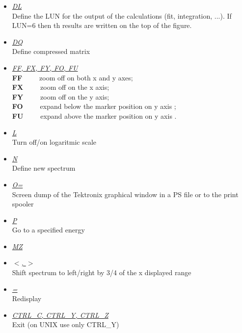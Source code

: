 \begin{itemize}
 \item	{\it\underline{DL}} \\

	Define the LUN for the output of the calculations (fit, integration,
	...). If LUN=6 then th results are written on the top of the figure.


	
 \item	{\it\underline{DQ}} \\

	Define compressed matrix
	
 \item	{\it\underline{FF, FX, FY, FO, FU}} \\

	{\bf FF}~~~~~zoom off on both x and y axes;\\
	{\bf FX}~~~~~zoom off on the x axis; \\
	{\bf FY}~~~~~zoom off on the y axis; \\
	{\bf FO}~~~~~expand below the marker position on y axis ;\\
	{\bf FU}~~~~~expand above the marker position on y axis .

 \item	{\it\underline{L}} \\

	Turn off/on logaritmic scale

 \item	{\it\underline{N}} \\

	Define new spectrum 

 \item	{\it\underline{O=}} \\

	Screen dump of the Tektronix graphical window in a PS file or to 
	the print spooler

 \item	{\it\underline{P}} \\

	Go to a specified energy

 \item	{\it\underline{MZ}} \\


 \item	{\it\underline{$<$, $>$}} \\

	Shift spectrum to left/right by 3/4 of the x displayed range
		  
 \item	{\it\underline{=}} \\

	Redisplay


 \item	{\it\underline{CTRL\_C, CTRL\_Y, CTRL\_Z}} \\

	Exit (on UNIX use only CTRL\_Y)
	
\end{itemize}



